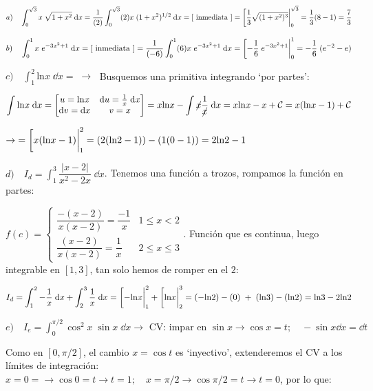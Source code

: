 \begin{proofw}\renewcommand{\qedsymbol}{$\diamond$}	


$a) \quad  \displaystyle \int_0^{\sqrt{3}} x\; \sqrt{1+x^2}\; \dd x =\displaystyle \frac 1 {(2)}\int_0^{\sqrt{3}} (2) x\; (1+x^2)^{1/2}\; \dd x = [\text { inmediata }] = \eval [
\frac 1 3 \sqrt{(1+x^2)^3} |_0^{\sqrt{3}}= \frac 1 3 (8-1)=\frac 7 3$


$b) \quad \displaystyle \int_{0}^{1} x\; e^{-3x^2+1} \; \dd x= [\text { inmediata }] =\frac {1}{(-6) } \int_{0}^{1} (6)x\; e^{-3x^2+1} \; \dd x = \eval[-\frac 1 6 \; e^{-3x^2+1}|_0^1=-\frac 1 6 \; (e^{-2}-e)$



$c) \quad \displaystyle \int_{1}^{2} \mathrm{ln}x \; \dd x= \; \to \;$ Busquemos una primitiva integrando `por partes':

$\displaystyle \int \mathrm{ln}x \; \dd x= 
\left[
\begin{matrix}
 u=\mathrm{ln} x & \dd u = \frac 1 x \; \dd x \\
 \dd v= \dd x & v=x	
 \end{matrix} 
 \right]= 
 x \mathrm{ln} x - \int \cancel{x} \frac {1}{\cancel{x}}\; \dd x = x \mathrm{ln} x - x + \mathcal C= x(\mathrm{ln}x - 1)+ \mathcal C$
 
 $\displaystyle \to \; = \eval[x(\mathrm{ln}x - 1)|_1^2= (2(\mathrm{ln}2-1))-(1(0-1))= 2\mathrm{ln}2-1$


$d) \quad \displaystyle I_d=\int_{1}^{3} \dfrac {|x-2|}{x^2-2x} \; \dd x$. Tenemos una función a trozos, rompamos la función en partes:

$f(c)=\begin{cases}
\dfrac {-(x-2)}{x(x-2)}= \dfrac {-1}{x} & 1\le x < 2 \\
\dfrac {(x-2)}{x(x-2)}= \dfrac {1}{x} & 2\le x \le 3	
\end{cases}$. Función que es continua, luego integrable en $[1,3]$, tan solo hemos de romper en el $2$:

$\displaystyle I_d= \int_{1}^{2} - \frac 1 x \; \dd x + \int_{2}^{3} \frac 1 x \; \dd x =\eval [-\mathrm{ln}x|_1^2+ \eval [\mathrm{ln}x|_2^3= (-\mathrm{ln}2)-(0) \; + \; (\mathrm{ln} 3) - (\mathrm{ln}2)=\mathrm{ln} 3-2\mathrm{ln} 2$	



$e) \quad I_e = \displaystyle \int_{0}^{\pi/2} \cos^2 x \; \sin x \; \dd x \rightarrow \text{ CV: impar en } \sin x \to \cos x=t; \quad  -\sin x \dd x = \dd t$

Como en $[0,\pi/2]$, el cambio $x=\cos t$ es `inyectivo', extenderemos el CV a los límites de integración:
$x=0=\to \cos 0=t  \to t=1; \quad x=\pi/2 \to \cos \pi/2 = t \to t=0$, por lo que:


\end{proofw}
